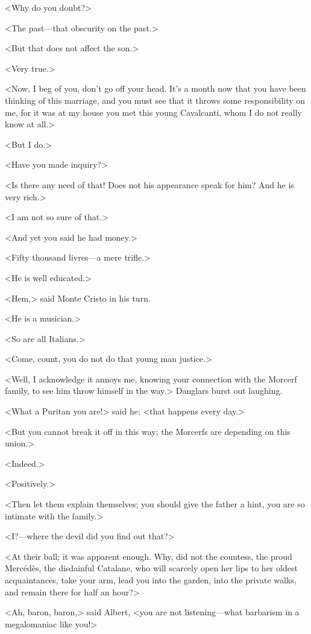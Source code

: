  <Why do you doubt?> 

 <The past—that obscurity on the past.> 

 <But that does not affect the son.> 

 <Very true.> 

 <Now, I beg of you, don't go off your head. It's a month now that you have been thinking of this marriage, and you must see that it throws some responsibility on me, for it was at my house you met this young Cavalcanti, whom I do not really know at all.> 

 <But I do.> 

 <Have you made inquiry?> 

 <Is there any need of that! Does not his appearance speak for him? And he is very rich.> 

 <I am not so sure of that.> 

 <And yet you said he had money.> 

 <Fifty thousand livres—a mere trifle.> 

 <He is well educated.> 

 <Hem,> said Monte Cristo in his turn. 

 <He is a musician.> 

 <So are all Italians.> 

 <Come, count, you do not do that young man justice.> 

 <Well, I acknowledge it annoys me, knowing your connection with the Morcerf family, to see him throw himself in the way.> Danglars burst out laughing. 

 <What a Puritan you are!> said he; <that happens every day.> 

 <But you cannot break it off in this way; the Morcerfs are depending on this union.> 

 <Indeed.> 

 <Positively.> 

 <Then let them explain themselves; you should give the father a hint, you are so intimate with the family.> 

 <I?—where the devil did you find out that?> 

 <At their ball; it was apparent enough. Why, did not the countess, the proud Mercédès, the disdainful Catalane, who will scarcely open her lips to her oldest acquaintances, take your arm, lead you into the garden, into the private walks, and remain there for half an hour?> 

 <Ah, baron, baron,> said Albert, <you are not listening—what barbarism in a megalomaniac like you!> 

